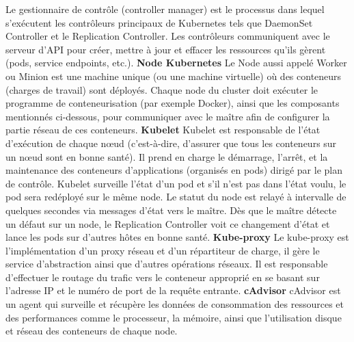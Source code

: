 \documentclass{article}
\begin{document}
Le gestionnaire de contrôle (controller manager) est le processus dans lequel s'exécutent les contrôleurs principaux de Kubernetes tels que DaemonSet Controller et le Replication Controller. Les contrôleurs communiquent avec le serveur d'API pour créer, mettre à jour et effacer les ressources qu'ils gèrent (pods, service endpoints, etc.).
\newline
\newline
\textbf{Node Kubernetes}
\newline
\newline
Le Node aussi appelé Worker ou Minion est une machine unique (ou une machine virtuelle) où des conteneurs (charges de travail) sont déployés. Chaque node du cluster doit exécuter le programme de conteneurisation (par exemple Docker), ainsi que les composants mentionnés ci-dessous, pour communiquer avec le maître afin de configurer la partie réseau de ces conteneurs.
\newline
\newline
\newline
\newline
\textbf{Kubelet}
\newline
\newline
Kubelet est responsable de l'état d'exécution de chaque nœud (c'est-à-dire, d'assurer que tous les conteneurs sur un nœud sont en bonne santé). Il prend en charge le démarrage, l'arrêt, et la maintenance des conteneurs d'applications (organisés en pods) dirigé par le plan de contrôle.
\newline
\newline
Kubelet surveille l'état d'un pod et s'il n'est pas dans l'état voulu, le pod sera redéployé sur le même node. Le statut du node est relayé à intervalle de quelques secondes via messages d’état vers le maître. Dès que le maître détecte un défaut sur un node, le Replication Controller voit ce changement d'état et lance les pods sur d'autres hôtes en bonne santé.
\newline
\newline
\textbf{Kube-proxy}
\newline
\newline
Le kube-proxy est l’implémentation d'un proxy réseau et d'un répartiteur de charge, il gère le service d'abstraction ainsi que d'autres opérations réseaux. Il est responsable d'effectuer le routage du trafic vers le conteneur approprié en se basant sur l'adresse IP et le numéro de port de la requête entrante.
\newline
\newline
\textbf{cAdvisor}
\newline
\newline
cAdvisor est un agent qui surveille et récupère les données de consommation des ressources et des performances comme le processeur, la mémoire, ainsi que l'utilisation disque et réseau des conteneurs de chaque node. 
\newline
\newline
\newpage
\end{document}
